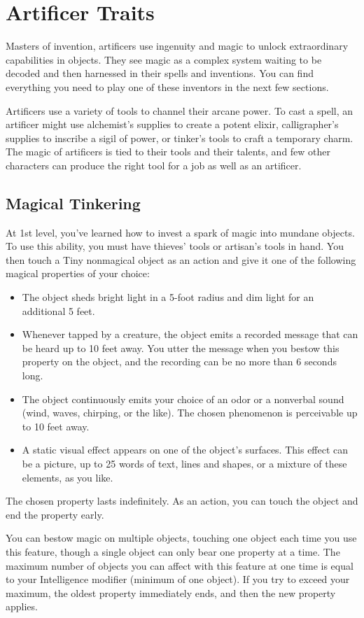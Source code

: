 \documentclass[letterpaper,openany,oneside,twocolumn]{book}
\begin{document}
\section*{Artificer Traits}
Masters of invention, artificers use ingenuity and magic to unlock extraordinary capabilities in objects. They see magic as a complex system waiting to be decoded and then harnessed in their spells and inventions. You can find everything you need to play one of these inventors in the next few sections.

Artificers use a variety of tools to channel their arcane power. To cast a spell, an artificer might use alchemist's supplies to create a potent elixir, calligrapher's supplies to inscribe a sigil of power, or tinker's tools to craft a temporary charm. The magic of artificers is tied to their tools and their talents, and few other characters can produce the right tool for a job as well as an artificer.
\subsection*{Magical Tinkering}
At 1st level, you've learned how to invest a spark of magic into mundane objects. To use this ability, you must have thieves' tools or artisan's tools in hand. You then touch a Tiny nonmagical object as an action and give it one of the following magical properties of your choice:
\begin{itemize}
	\item The object sheds bright light in a 5-foot radius and dim light for an additional 5 feet.
	\item Whenever tapped by a creature, the object emits a recorded message that can be heard up to 10 feet away. You utter the message when you bestow this property on the object, and the recording can be no more than 6 seconds long.
	\item The object continuously emits your choice of an odor or a nonverbal sound (wind, waves, chirping, or the like). The chosen phenomenon is perceivable up to 10 feet away.
	\item A static visual effect appears on one of the object's surfaces. This effect can be a picture, up to 25 words of text, lines and shapes, or a mixture of these elements, as you like.
\end{itemize}
The chosen property lasts indefinitely. As an action, you can touch the object and end the property early.

You can bestow magic on multiple objects, touching one object each time you use this feature, though a single object can only bear one property at a time. The maximum number of objects you can affect with this feature at one time is equal to your Intelligence modifier (minimum of one object). If you try to exceed your maximum, the oldest property immediately ends, and then the new property applies.
\end{document}
